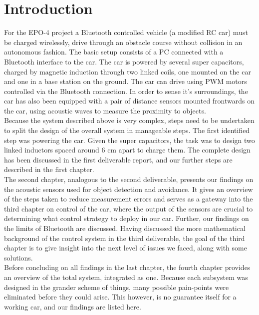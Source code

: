 \documentclass[11pt,titlepage]{report}
\begin{document}
\chapter{Introduction}
For the EPO-4 project a Bluetooth controlled vehicle (a modified RC car) must be charged wirelessly, drive through an obstacle course without collision in an autonomous fashion. The basic setup consists of a PC connected with a Bluetooth interface to the car. The car is powered by several super capacitors, charged by magnetic induction through two linked coils, one mounted on the car and one in a base station on the ground. The car can drive using PWM motors controlled via the Bluetooth connection. In order to sense it's surroundings, the car has also been equipped with a pair of distance sensors mounted frontwards on the car, using acoustic waves to measure the proximity to objects.\\
Because the system described above is very complex, steps need to be undertaken to split the design of the overall system in manageable steps. The first identified step was powering the car. Given the super capacitors, the task was to design two linked inductors spaced around 6 cm apart to charge them. The complete design has been discussed in the first deliverable report, and our further steps are described in the first chapter.\\
The second chapter, analogous to the second deliverable, presents our findings on the acoustic sensors used for object detection and avoidance. It gives an overview of the steps taken to reduce measurement errors and serves as a gateway into the third chapter on control of the car, where the output of the sensors are crucial to determining what control strategy to deploy in our car. Further, our findings on the limits of Bluetooth are discussed. Having discussed the more mathematical background of the control system in the third deliverable, the goal of the third chapter is to give insight into the next level of issues we faced, along with some solutions.\\
Before concluding on all findings in the last chapter, the fourth chapter provides an overview of the total system, integrated as one. Because each subsystem was designed in the grander scheme of things, many possible pain-points were eliminated before they could arise. This however, is no guarantee itself for a working car, and our findings are listed here.
\end{document}
